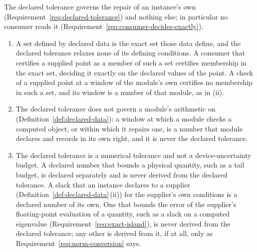 
\begin{requirement}\label{req:tolerance-scope}
The declared tolerance governs the repair of an instance's own
 (Requirement~\ref{req:declared-tolerance}) and nothing
else; in particular no consumer reads it
(Requirement~\ref{req:consumer-decides-exactly}).
\begin{enumerate}[label=(\roman*),leftmargin=2.4em]
\item A set defined by declared data is the exact set those data define, and
  the declared tolerance relaxes none of its defining conditions. A consumer
  that certifies a supplied point as a member of such a set certifies
  membership in the exact set, deciding it exactly on the declared values of
  the point. A check of a supplied point at a window of the module's own
  certifies no membership in such a set, and its window is a number of that
  module, as in (ii).
\item The declared tolerance does not govern a module's arithmetic on
   (Definition~\ref{def:declared-data}):
  a window at which a module checks a computed object, or within which it
  repairs one, is a number that module declares and records in its own right,
  and it is never the declared tolerance.
\item The declared tolerance is a numerical tolerance and not a
  device-uncertainty budget. A declared number that bounds a physical
  quantity, such as a tail budget, is declared separately and is never derived
  from the declared tolerance. A slack that an instance declares to a supplier
  (Definition~\ref{def:declared-data}\,(ii)) for the supplier's own conditions
  is a declared number of its own. One that bounds the error of the
  supplier's floating-point evaluation of a quantity, such as a slack on a
  computed eigenvalue (Requirement~\ref{req:exact-island}), is never derived
  from the declared tolerance; any other is derived from it, if at all, only
  as Requirement~\ref{req:norm-conversion} says.
\end{enumerate}
\end{requirement}
